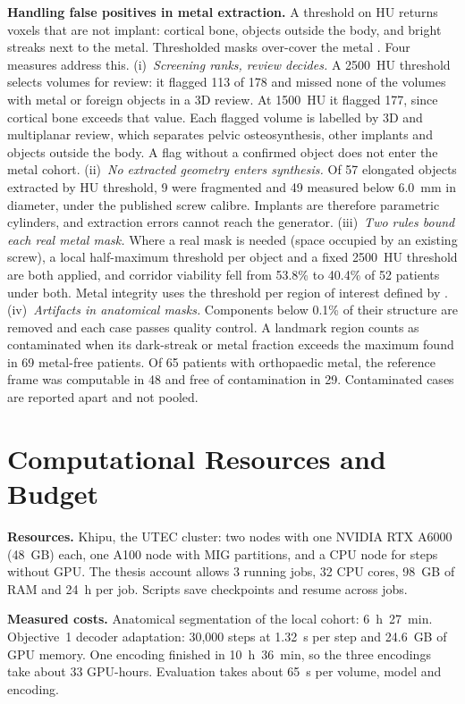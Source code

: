 \documentclass[9pt]{extarticle}
\begin{document}
\textbf{Handling false positives in metal extraction.} A threshold on HU returns voxels that are not implant: cortical bone, objects outside the body, and bright streaks next to the metal. Thresholded masks over-cover the metal \citep{xie2024implantsegmentation}. Four measures address this.
(i)~\emph{Screening ranks, review decides.} A 2500~HU threshold selects volumes for review: it flagged 113 of 178 and missed none of the volumes with metal or foreign objects in a 3D review. At 1500~HU it flagged 177, since cortical bone exceeds that value. Each flagged volume is labelled by 3D and multiplanar review, which separates pelvic osteosynthesis, other implants and objects outside the body. A flag without a confirmed object does not enter the metal cohort.
(ii)~\emph{No extracted geometry enters synthesis.} Of 57 elongated objects extracted by HU threshold, 9 were fragmented and 49 measured below 6.0~mm in diameter, under the published screw calibre. Implants are therefore parametric cylinders, and extraction errors cannot reach the generator.
(iii)~\emph{Two rules bound each real metal mask.} Where a real mask is needed (space occupied by an existing screw), a local half-maximum threshold per object and a fixed 2500~HU threshold are both applied, and corridor viability fell from 53.8\% to 40.4\% of 52 patients under both. Metal integrity uses the threshold per region of interest defined by \citet{peters2025hybrid}.
(iv)~\emph{Artifacts in anatomical masks.} Components below 0.1\% of their structure are removed and each case passes quality control. A landmark region counts as contaminated when its dark-streak or metal fraction exceeds the maximum found in 69 metal-free patients. Of 65 patients with orthopaedic metal, the reference frame was computable in 48 and free of contamination in 29. Contaminated cases are reported apart and not pooled.

\section{Computational Resources and Budget}

\textbf{Resources.} Khipu, the UTEC cluster: two nodes with one NVIDIA RTX A6000 (48~GB) each, one A100 node with MIG partitions, and a CPU node for steps without GPU. The thesis account allows 3 running jobs, 32 CPU cores, 98~GB of RAM and 24~h per job. Scripts save checkpoints and resume across jobs.

\textbf{Measured costs.} Anatomical segmentation of the local cohort: 6~h~27~min. Objective~1 decoder adaptation: 30{,}000 steps at 1.32~s per step and 24.6~GB of GPU memory. One encoding finished in 10~h~36~min, so the three encodings take about 33 GPU-hours. Evaluation takes about 65~s per volume, model and encoding.
\end{document}
